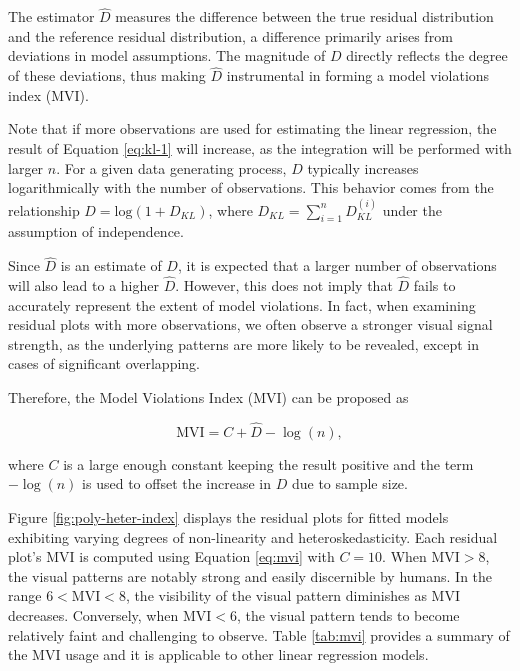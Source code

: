 \documentclass[]{interact}
\theoremstyle{plain}%
\theoremstyle{definition}
\theoremstyle{remark}
\begin{document}
The estimator \(\hat{D}\) measures the difference between the true
residual distribution and the reference residual distribution, a
difference primarily arises from deviations in model assumptions. The
magnitude of \(D\) directly reflects the degree of these deviations,
thus making \(\hat{D}\) instrumental in forming a model violations index
(MVI).

Note that if more observations are used for estimating the linear
regression, the result of Equation \ref{eq:kl-1} will increase, as the
integration will be performed with larger \(n\). For a given data
generating process, \(D\) typically increases logarithmically with the
number of observations. This behavior comes from the relationship
\(D = \text{log}(1 + D_{KL})\), where
\(D_{KL} = \sum_{i=1}^{n}D_{KL}^{(i)}\) under the assumption of
independence.

Since \(\hat{D}\) is an estimate of \(D\), it is expected that a larger
number of observations will also lead to a higher \(\hat{D}\). However,
this does not imply that \(\hat{D}\) fails to accurately represent the
extent of model violations. In fact, when examining residual plots with
more observations, we often observe a stronger visual signal strength,
as the underlying patterns are more likely to be revealed, except in
cases of significant overlapping.

Therefore, the Model Violations Index (MVI) can be proposed as

\begin{equation} \label{eq:mvi}
\text{MVI} = C + \hat{D} - \log(n),
\end{equation}

\noindent where \(C\) is a large enough constant keeping the result
positive and the term \(-\log(n)\) is used to offset the increase in
\(D\) due to sample size.

Figure \ref{fig:poly-heter-index} displays the residual plots for fitted
models exhibiting varying degrees of non-linearity and
heteroskedasticity. Each residual plot's MVI is computed using Equation
\ref{eq:mvi} with \(C = 10\). When \(\text{MVI} > 8\), the visual
patterns are notably strong and easily discernible by humans. In the
range \(6 < \text{MVI} < 8\), the visibility of the visual pattern
diminishes as MVI decreases. Conversely, when \(\text{MVI} < 6\), the
visual pattern tends to become relatively faint and challenging to
observe. Table \ref{tab:mvi} provides a summary of the MVI usage and it
is applicable to other linear regression models.
\end{document}
